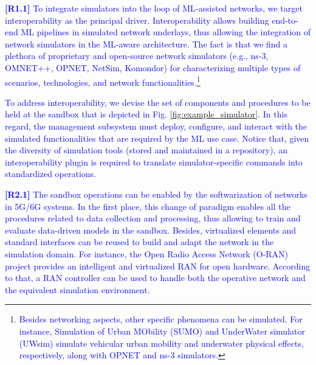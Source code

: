 \documentclass[journal]{IEEEtran}
\begin{document}
	\textcolor{blue}{\textbf{[R1.1]} To integrate simulators into the loop of ML-assisted networks, we target interoperability as the principal driver. Interoperability allows building end-to-end ML pipelines in simulated network underlays, thus allowing the integration of network simulators in the ML-aware architecture. The fact is that we find a plethora of proprietary and open-source network simulators (e.g., ns-3, OMNET++, OPNET, NetSim, Komondor) for characterizing multiple types of scenarios, technologies, and network functionalities.\footnote{\textcolor{blue}{Besides networking aspects, other specific phenomena can be simulated. For instance, Simulation of Urban MObility (SUMO) and UnderWater simulator (UWsim) simulate vehicular urban mobility and underwater physical effects, respectively, along with OPNET and ns-3 simulators.}}}
		
	\textcolor{blue}{To address interoperability, we devise the set of components and procedures to be held at the sandbox that is depicted in Fig. \ref{fig:example_simulator}. In this regard, the management subsystem must deploy, configure, and interact with the simulated functionalities that are required by the ML use case. Notice that, given the diversity of simulation tools (stored and maintained in a repository), an interoperability plugin is required to translate simulator-specific commands into standardized operations.} 
			
	\textcolor{blue}{\textbf{[R2.1]} The sandbox operations can be enabled by the softwarization of networks in 5G/6G systems. In the first place, this change of paradigm enables all the procedures related to data collection and processing, thus allowing to train and evaluate data-driven models in the sandbox. Besides, virtualized elements and standard interfaces can be reused to build and adapt the network in the simulation domain. For instance, the Open Radio Access Network (O-RAN) project provides an intelligent and virtualized RAN for open hardware. According to that, a RAN controller can be used to handle both the operative network and the equivalent simulation environment.} 
	
\end{document}
